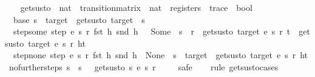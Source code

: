 \begin{isabellebody}
\ \ \isamarkupfalse%
%
\endisatagproof
{\isafoldproof}%
%
\isadelimproof
\isanewline
%
\endisadelimproof
\isanewline
{}\isamarkupfalse%
\ gets{\isacharunderscore}us{\isacharunderscore}to\ {\isacharcolon}{\isacharcolon}\ {\isachardoublequoteopen}nat\ {\isasymRightarrow}\ transition{\isacharunderscore}matrix\ {\isasymRightarrow}\ nat\ {\isasymRightarrow}\ registers\ {\isasymRightarrow}\ trace\ {\isasymRightarrow}\ bool{\isachardoublequoteclose}\ \isanewline
\ \ base{\isacharcolon}\ {\isachardoublequoteopen}s\ {\isacharequal}\ target\ {\isasymLongrightarrow}\ gets{\isacharunderscore}us{\isacharunderscore}to\ target\ {\isacharunderscore}\ s\ {\isacharunderscore}\ {\isacharbrackleft}{\isacharbrackright}{\isachardoublequoteclose}\ {\isacharbar}\isanewline
\ \ step{\isacharunderscore}some{\isacharcolon}\ {\isachardoublequoteopen}step\ e\ s\ r\ {\isacharparenleft}fst\ h{\isacharparenright}\ {\isacharparenleft}snd\ h{\isacharparenright}\ {\isacharequal}\ \ Some\ {\isacharparenleft}{\isacharunderscore}{\isacharcomma}\ s{\isacharprime}{\isacharcomma}\ {\isacharunderscore}{\isacharcomma}\ r{\isacharprime}{\isacharparenright}\ {\isasymLongrightarrow}\ gets{\isacharunderscore}us{\isacharunderscore}to\ target\ e\ s{\isacharprime}\ r{\isacharprime}\ t\ {\isasymLongrightarrow}\ gets{\isacharunderscore}us{\isacharunderscore}to\ target\ e\ s\ r\ {\isacharparenleft}h{\isacharhash}t{\isacharparenright}{\isachardoublequoteclose}\ {\isacharbar}\isanewline
\ \ step{\isacharunderscore}none{\isacharcolon}\ {\isachardoublequoteopen}step\ e\ s\ r\ {\isacharparenleft}fst\ h{\isacharparenright}\ {\isacharparenleft}snd\ h{\isacharparenright}\ {\isacharequal}\ None\ {\isasymLongrightarrow}\ s\ {\isacharequal}\ target\ {\isasymLongrightarrow}\ gets{\isacharunderscore}us{\isacharunderscore}to\ target\ e\ s\ r\ {\isacharparenleft}h{\isacharhash}t{\isacharparenright}{\isachardoublequoteclose}\isanewline
\isanewline
{}\isamarkupfalse%
\ no{\isacharunderscore}further{\isacharunderscore}steps{\isacharcolon}\ {\isachardoublequoteopen}s\ {\isasymnoteq}\ s{\isacharprime}\ {\isasymLongrightarrow}\ {\isasymnot}\ gets{\isacharunderscore}us{\isacharunderscore}to\ s\ e\ s{\isacharprime}\ r\ {\isacharbrackleft}{\isacharbrackright}{\isachardoublequoteclose}\isanewline
%
\isadelimproof
\ \ %
\endisadelimproof
%
\isatagproof
{}\isamarkupfalse%
\ safe\isanewline
\ \ \isamarkupfalse%
\ {\isacharparenleft}rule\ gets{\isacharunderscore}us{\isacharunderscore}to{\isachardot}cases{\isacharparenright}\isanewline

\end{isabellebody}
